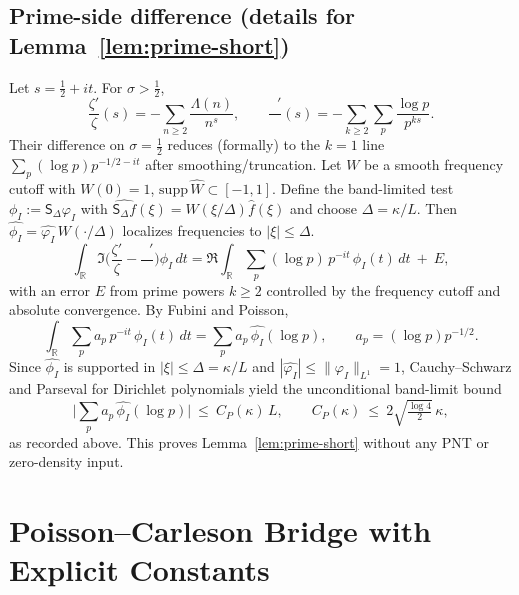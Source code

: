 \documentclass[11pt]{article}
\theoremstyle{definition}
\theoremstyle{remark}
\newcommand{\R}{\mathbb{R}}
\DeclareMathOperator{\dettwo}{det_2}
\begin{document}
\subsection{Prime-side difference (details for Lemma~\ref{lem:prime-short})}
Let \(s=\tfrac12+it\). For \(\sigma>\tfrac12\),
\[\frac{\zeta'}{\zeta}(s)= -\sum_{n\ge 2}\frac{\Lambda(n)}{n^s},\qquad \frac{\dettwo'}{\dettwo}(s)= -\sum_{k\ge 2}\sum_{p}\frac{\log p}{p^{ks}}.\]
Their difference on \(\sigma=\tfrac12\) reduces (formally) to the \(k=1\) line \(\sum_p (\log p) p^{-1/2-it}\) after smoothing/truncation. Let \(W\) be a smooth frequency cutoff with \(W(0)=1\), \(\mathrm{supp}\,\widehat W\subset[-1,1]\). Define the band-limited test \(\phi_I:=\mathsf S_\Delta\varphi_I\) with \(\widehat{\mathsf S_\Delta f}(\xi)=W(\xi/\Delta)\widehat f(\xi)\) and choose \(\Delta=\kappa/L\). Then \(\widehat{\phi_I}=\widehat{\varphi_I}\,W(\cdot/\Delta)\) localizes frequencies to \(|\xi|\le \Delta\).
\[\int_{\R}\Im\Big(\frac{\zeta'}{\zeta}-\frac{\dettwo'}{\dettwo}\Big)\phi_I\,dt=\Re\int_{\R}\sum_{p}(\log p)\,p^{-it}\,\phi_I(t)\,dt\ +\ E,\]
with an error \(E\) from prime powers \(k\ge 2\) controlled by the frequency cutoff and absolute convergence. By Fubini and Poisson,
\[\int_{\R}\sum_{p}a_p\,p^{-it}\,\phi_I(t)\,dt=\sum_{p}a_p\,\widehat{\phi_I}(\log p),\qquad a_p=(\log p) p^{-1/2}.\]
Since \(\widehat{\phi_I}\) is supported in \(|\xi|\le \Delta=\kappa/L\) and \(|\widehat{\varphi_I}|\le \|\varphi_I\|_{L^1}=1\), Cauchy–Schwarz and Parseval for Dirichlet polynomials yield the unconditional band-limit bound
\[\Big|\sum_{p}a_p\,\widehat{\phi_I}(\log p)\Big|\ \le\ C_P(\kappa)\,L,\qquad C_P(\kappa)\ \le\ 2\sqrt{\tfrac{\log 4}{2}}\,\kappa,\]
as recorded above. This proves Lemma~\ref{lem:prime-short} without any PNT or zero-density input.

\section{Poisson--Carleson Bridge with Explicit Constants}\label{sec:pc-bridge}
\end{document}
